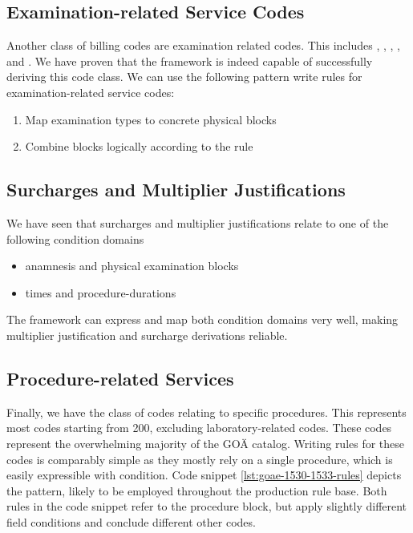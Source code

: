 \subsection{Examination-related Service Codes}\label{subsec:examination-related-service-codes}
Another class of billing codes are examination related codes.
This includes , , , ,  and .
We have proven that the framework is indeed capable of successfully deriving this code class.
We can use the following pattern write rules for examination-related service codes:
\begin{enumerate}
    \item Map examination types to concrete physical blocks
    \item Combine blocks logically according to the rule
\end{enumerate}

\subsection{Surcharges and Multiplier Justifications}\label{subsec:surcharges-and-multiplier-justifications}
We have seen that surcharges and multiplier justifications relate to one of the following condition domains
\begin{itemize}
    \item anamnesis and physical examination blocks
    \item times and procedure-durations
\end{itemize}
The framework can express and map both condition domains very well, making multiplier justification and surcharge derivations reliable.

\subsection{Procedure-related Services}\label{subsec:procedure-related-services}
Finally, we have the class of codes relating to specific procedures.
This represents most codes starting from 200, excluding laboratory-related codes.
These codes represent the overwhelming majority of the GOÄ catalog.
Writing rules for these codes is comparably simple as they mostly rely on a single procedure, which is easily expressible with \requiredProcedure condition.
Code snippet \ref{lst:goae-1530-1533-rules} depicts the pattern, likely to be employed throughout the production rule base.
Both rules in the code snippet refer to the \laryngoscopy procedure block, but apply slightly different field conditions and conclude different other codes.

